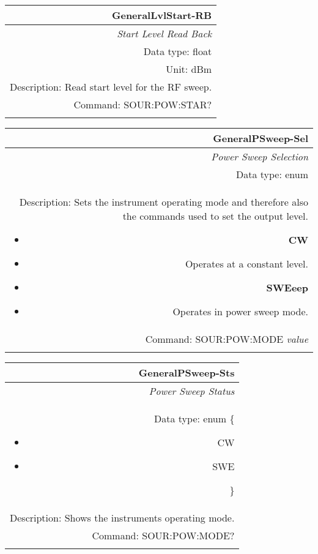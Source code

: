 \documentclass[openany]{article}
\begin{document}
		\begin{tabular}{N}
			\hline
			\bfseries GeneralLvlStart-RB \\ \hline
			\emph{Start Level Read Back} \\
			Data type: float \\
			Unit: dBm \\
			Description: Read start level for the RF sweep. \\
			Command: SOUR:POW:STAR? \\
			\\

		\end{tabular}

		
		\begin{tabular}{N}
			\hline
			\bfseries GeneralPSweep-Sel \\ \hline
			\emph{Power Sweep Selection} \\
			Data type: enum \\
			Description: Sets the instrument operating mode and therefore also the commands used to set the output level. \begin{itemize}[noitemsep]
				\item[] \textbf{CW} 
				\item[] Operates at a constant level.
				\item[] \textbf{SWEeep}
				\item[] Operates in power sweep mode.
			\end{itemize} \\
			Command: SOUR:POW:MODE \emph{value} \\
			\\

		\end{tabular}


		\begin{tabular}{N}
			\hline
			\bfseries GeneralPSweep-Sts \\ \hline
			\emph{Power Sweep Status} \\
			Data type: enum \{\begin{itemize}[noitemsep]
				\small
				\item[] CW
				\item[] SWE
			\end{itemize}\} \\
			Description: Shows the instruments operating mode.\\
			Command: SOUR:POW:MODE? \\
			\\

		\end{tabular}
\end{document}
